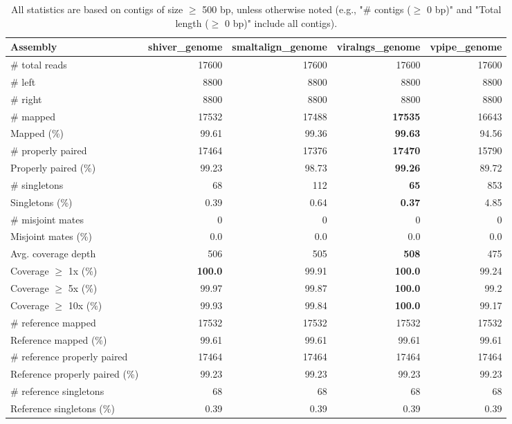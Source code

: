 \documentclass[12pt,a4paper]{article}
\begin{document}
\begin{table}[ht]
\begin{center}
\caption{All statistics are based on contigs of size $\geq$ 500 bp, unless otherwise noted (e.g., "\# contigs ($\geq$ 0 bp)" and "Total length ($\geq$ 0 bp)" include all contigs).}
\begin{tabular}{|l*{4}{|r}|}
\hline
Assembly & shiver\_genome & smaltalign\_genome & viralngs\_genome & vpipe\_genome \\ \hline
\# total reads & 17600 & 17600 & 17600 & 17600 \\ \hline
\# left & 8800 & 8800 & 8800 & 8800 \\ \hline
\# right & 8800 & 8800 & 8800 & 8800 \\ \hline
\# mapped & 17532 & 17488 & {\bf 17535} & 16643 \\ \hline
Mapped (\%) & 99.61 & 99.36 & {\bf 99.63} & 94.56 \\ \hline
\# properly paired & 17464 & 17376 & {\bf 17470} & 15790 \\ \hline
Properly paired (\%) & 99.23 & 98.73 & {\bf 99.26} & 89.72 \\ \hline
\# singletons & 68 & 112 & {\bf 65} & 853 \\ \hline
Singletons (\%) & 0.39 & 0.64 & {\bf 0.37} & 4.85 \\ \hline
\# misjoint mates & 0 & 0 & 0 & 0 \\ \hline
Misjoint mates (\%) & 0.0 & 0.0 & 0.0 & 0.0 \\ \hline
Avg. coverage depth & 506 & 505 & {\bf 508} & 475 \\ \hline
Coverage $\geq$ 1x (\%) & {\bf 100.0} & 99.91 & {\bf 100.0} & 99.24 \\ \hline
Coverage $\geq$ 5x (\%) & 99.97 & 99.87 & {\bf 100.0} & 99.2 \\ \hline
Coverage $\geq$ 10x (\%) & 99.93 & 99.84 & {\bf 100.0} & 99.17 \\ \hline
\# reference mapped & 17532 & 17532 & 17532 & 17532 \\ \hline
Reference mapped (\%) & 99.61 & 99.61 & 99.61 & 99.61 \\ \hline
\# reference properly paired & 17464 & 17464 & 17464 & 17464 \\ \hline
Reference properly paired (\%) & 99.23 & 99.23 & 99.23 & 99.23 \\ \hline
\# reference singletons & 68 & 68 & 68 & 68 \\ \hline
Reference singletons (\%) & 0.39 & 0.39 & 0.39 & 0.39 \\ \hline

\end{tabular}
\end{center}
\end{table}
\end{document}

